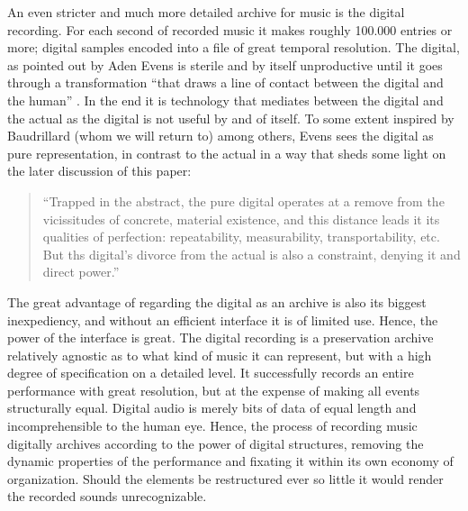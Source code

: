 \documentclass[11pt,a4paper]{article}
\begin{document}
An even stricter and much more detailed archive for music is the digital recording. For each second of recorded music it makes roughly 100.000 entries or more; digital samples encoded into a file of great temporal resolution. The digital, as pointed out by Aden Evens \citep[p. 79]{evens05} is sterile and by itself unproductive until it goes through a transformation ``that draws a line of contact between the digital and the human'' \citep[p. 79]{evens05}. In the end it is technology that mediates between the digital and the actual as the digital is not useful by and of itself. To some extent inspired by Baudrillard (whom we will return to) among others, Evens sees the digital as pure representation, in contrast to the actual in a way that sheds some light on the later discussion of this paper:
\begin{quote}
``Trapped in the abstract, the pure digital operates at a remove from the vicissitudes of concrete, material existence, and this distance leads it its qualities of perfection: repeatability, measurability, transportability, etc. But ths digital's divorce from the actual is also a constraint, denying it and direct power.'' \citep[p. 79]{evens05}
\end{quote}

The great advantage of regarding the digital as an archive is also its biggest inexpediency, and without an efficient interface it is of limited use. Hence, the power of the interface is great. The digital recording is a preservation archive relatively agnostic as to what kind of music it can represent, but with a high degree of specification on a detailed level. It successfully records an entire performance with great resolution, but at the expense of making all events structurally equal. Digital audio is merely bits of data of equal length and incomprehensible to the human eye. Hence, the process of recording music digitally archives according to the power of digital structures, removing the dynamic properties of the performance and fixating it within its own economy of organization. Should the elements be restructured ever so little it would render the recorded sounds unrecognizable.
\end{document}

